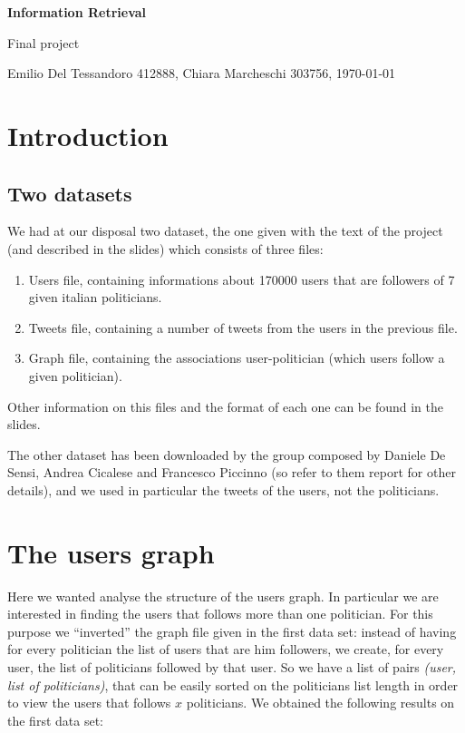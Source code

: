 \documentclass[a4paper,11pt,oneside]{article}
\begin{document}
\begin{center}\begin{huge}\textbf{Information Retrieval}\end{huge}
\medskip 

\begin{huge}Final project\end{huge}
\bigskip 

\begin{large}
Emilio Del Tessandoro 412888, Chiara Marcheschi 303756, \today
\end{large}
\end{center}


\section{Introduction}
\label{sec:intro}

\subsection{Two datasets}
We had at our disposal two dataset, the one given with the text of the project (and described in the slides) which consists of three files:
\begin{enumerate}
\item Users file, containing informations about 170000 users that are followers of 7 given italian politicians.
\item Tweets file, containing a number of tweets from the users in the previous file.
\item Graph file, containing the associations user-politician (which users follow a given politician).
\end{enumerate}
Other information on this files and the format of each one can be found in the slides.

The other dataset has been downloaded by the group composed by Daniele De Sensi, Andrea Cicalese and Francesco Piccinno (so refer to them report for other details), and we used in particular the tweets of the users, not the politicians.


\section{The users graph}
Here we wanted analyse the structure of the users graph. In particular we are interested in finding the users that follows more than one politician. For this purpose we ``inverted'' the graph file given in the first data set: instead of having for every politician the list of users that are him followers, we create, for every user, the list of politicians followed by that user.
So we have a list of pairs \textit{(user, list of politicians)}, that can be easily sorted on the politicians list length in order to view the users that follows $x$ politicians. We obtained the following results on the first data set:
\end{document}
